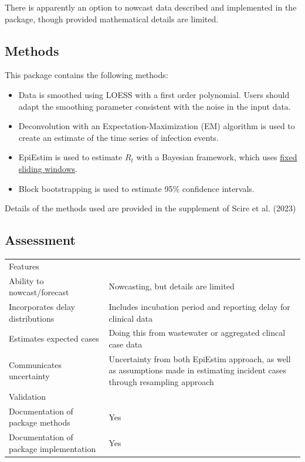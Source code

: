 \documentclass[
  letterpaper,
  DIV=11,
  numbers=noendperiod]{scrreprt}
\providecommand{\tightlist}{%
  \setlength{\itemsep}{0pt}\setlength{\parskip}{0pt}}\usepackage{longtable,booktabs,array}
\begin{document}
There is apparently an option to nowcast data described and implemented
in the package, though provided mathematical details are limited.

\subsection*{Methods}\label{methods-11}

This package contains the following methods:

\begin{itemize}
\tightlist
\item
  Data is smoothed using LOESS with a first order polynomial. Users
  should adapt the smoothing parameter consistent with the noise in the
  input data.
\item
  Deconvolution with an Expectation-Maximization (EM) algorithm is used
  to create an estimate of the time series of infection events.
\item
  EpiEstim is used to estimate \(R_t\) with a Bayesian framework, which
  uses \hyperref[sec-fixedwindow]{fixed sliding windows}.
\item
  Block bootstrapping is used to estimate 95\% confidence intervals.
\end{itemize}

Details of the methods used are provided in the supplement of Scire et
al. (2023)

\subsection*{Assessment}\label{assessment-11}

\begin{longtable}[]{@{}
  >{\raggedright\arraybackslash}p{}
  >{\raggedright\arraybackslash}p{}@{}}
\toprule\noalign{}
\endhead
\bottomrule\noalign{}
\endlastfoot
Features & \\
Ability to nowcast/forecast & Nowcasting, but details are limited \\
Incorporates delay distributions & Includes incubation period and
reporting delay for clinical data \\
Estimates expected cases & Doing this from wastewater or aggregated
clincal case data \\
Communicates uncertainty & Uncertainty from both EpiEstim approach, as
well as assumptions made in estimating incident cases through resampling
approach \\
Validation & \\
Documentation of package methods & Yes \\
Documentation of package implementation & Yes \\
\end{longtable}
\end{document}
